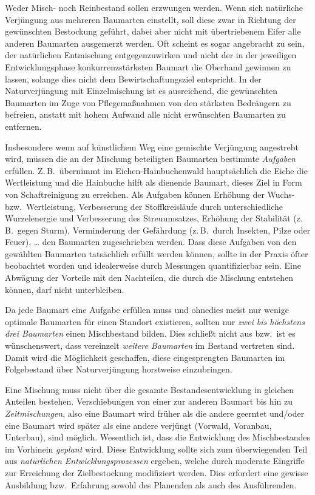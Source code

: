 \documentclass[twocolumn, paper=a4, fontsize=10pt, bibliography=totoc, index=totoc]{scrartcl}
\begin{document}
Weder Misch- noch Reinbestand sollen erzwungen werden. Wenn sich
natürliche Verjüngung aus mehreren Baumarten einstellt, soll diese zwar
in Richtung der gewünschten Bestockung geführt, dabei aber nicht mit
übertriebenem Eifer alle anderen Baumarten ausgemerzt werden. Oft
scheint es sogar angebracht zu sein, der natürlichen Entmischung
entgegenzuwirken und nicht der in der jeweiligen Entwicklungsphase
konkurrenzstärksten Baumart die Oberhand gewinnen zu lassen, solange
dies nicht dem Bewirtschaftungsziel entspricht. In der
Naturverjüngung mit Einzelmischung ist es ausreichend, die
gewünschten Baumarten im Zuge von Pflegemaßnahmen von den stärksten
Bedrängern zu befreien, anstatt mit hohem Aufwand alle nicht
erwünschten Baumarten zu entfernen.

Insbesondere wenn auf künstlichem Weg eine gemischte Verjüngung
angestrebt wird, müssen die an der Mischung beteiligten Baumarten
bestimmte \emph{Aufgaben} erfüllen. Z.\,B.\ übernimmt im Eichen-Hainbuchenwald hauptsächlich die Eiche die Wertleistung und die
Hainbuche hilft als dienende Baumart, dieses Ziel in Form von
Schaftreinigung zu erreichen. Als Aufgaben können Erhöhung der
Wuchs- bzw.\ Wertleistung, Verbesserung der Stoffkreisläufe durch
unterschiedliche Wurzelenergie und Verbesserung des Streuumsatzes,
Erhöhung der Stabilität (z.\,B.\ gegen Sturm), Verminderung der
Gefährdung (z.\,B.\ durch Insekten, Pilze oder Feuer), \dots{} den
Baumarten zugeschrieben werden. Dass diese Aufgaben von den gewählten
Baumarten tatsächlich erfüllt werden können, sollte in der Praxis öfter
beobachtet worden und idealerweise durch Messungen quantifizierbar
sein. Eine Abwägung der Vorteile mit den Nachteilen, die durch die Mischung entstehen können, darf nicht unterbleiben.

Da jede Baumart eine Aufgabe erfüllen muss und ohnedies meist nur
wenige optimale Baumarten für einen Standort existieren, sollten nur
\emph{zwei bis höchstens drei Baumarten} einen Mischbestand
bilden. Dies schließt nicht aus bzw.\ ist es wünschenswert, dass
vereinzelt \emph{weitere Baumarten} im Bestand vertreten sind. Damit
wird die Möglichkeit geschaffen, diese eingesprengten Baumarten im
Folgebestand über Naturverjüngung horstweise einzubringen.

Eine Mischung muss nicht über die gesamte Bestandesentwicklung in
gleichen Anteilen bestehen. Verschiebungen von einer zur anderen
Baumart bis hin zu \emph{Zeitmischungen}, also eine Baumart wird
früher als die andere geerntet und/oder eine Baumart wird später als
eine andere verjüngt (Vorwald, Voranbau, Unterbau), sind
möglich. Wesentlich ist, dass die Entwicklung des Mischbestandes im
Vorhinein \emph{geplant} wird. Diese Entwicklung sollte sich zum
überwiegenden Teil aus \emph{natürlichen Entwicklungsprozessen}
ergeben, welche durch moderate Eingriffe zur Erreichung der
Zielbestockung modifiziert werden. Dies erfordert eine gewisse
Ausbildung bzw.\ Erfahrung sowohl des Planenden als auch des Ausführenden.
\end{document}
